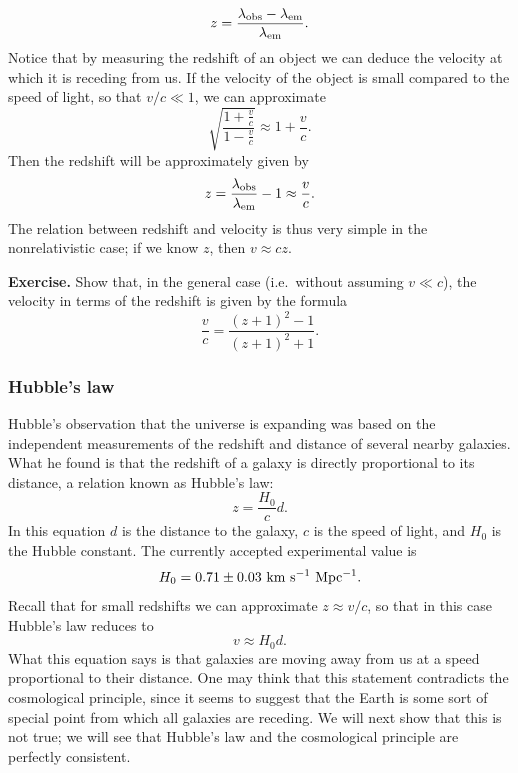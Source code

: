 \documentclass[11pt, a4paper,oneside,openright]{book}
\numberwithin{equation}{section}
\begin{document}
\begin{equation}
z=\frac{\lambda_{\rm obs}-\lambda_{\rm em}}{\lambda_{\rm em}}.
\end{equation}
Notice that by measuring the redshift of an object we can deduce the velocity at which it is receding from us. If the velocity of the object is small compared to the speed of light, so that $v/c\ll1$, we can approximate
\begin{equation}
\sqrt{\frac{1+\frac{v}{c}}{1-\frac{v}{c}}}\approx 1+\frac{v}{c}.
\end{equation}
Then the redshift will be approximately given by
\begin{equation}
z=\frac{\lambda_{\rm obs}}{\lambda_{\rm em}}-1\approx \frac{v}{c}.
\end{equation}
The relation between redshift and velocity is thus very simple in the nonrelativistic case; if we know $z$, then $v\approx cz$.

\par\vspace{\baselineskip}

{\bf Exercise.} Show that, in the general case (i.e.\ without assuming $v\ll c$), the velocity in terms of the redshift is given by the formula
\begin{equation}
\frac{v}{c}=\frac{(z+1)^2-1}{(z+1)^2+1}.
\end{equation}

\par\vspace{\baselineskip}

\subsubsection{Hubble's law}

Hubble's observation that the universe is expanding was based on the independent measurements of the redshift and distance of several nearby galaxies. What he found is that the redshift of a galaxy is directly proportional to its distance, a relation known as Hubble's law:
\begin{equation}
z=\frac{H_0}{c}d.
\end{equation}
In this equation $d$ is the distance to the galaxy, $c$ is the speed of light, and $H_0$ is the Hubble constant. The currently accepted experimental value is
\begin{equation}
H_0=0.71\pm 0.03~{\rm km~s^{-1}~Mpc^{-1}}.
\end{equation}
Recall that for small redshifts we can approximate $z\approx v/c$, so that in this case Hubble's law reduces to
\begin{equation}
v\approx H_0 d.
\end{equation}
What this equation says is that galaxies are moving away from us at a speed proportional to their distance. One may think that this statement contradicts the cosmological principle, since it seems to suggest that the Earth is some sort of special point from which all galaxies are receding. We will next show that this is not true; we will see that Hubble's law and the cosmological principle are perfectly consistent.
\end{document}
